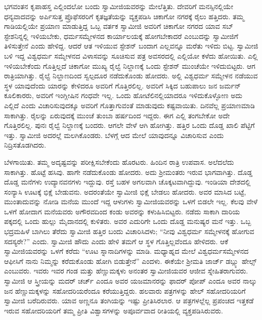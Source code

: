  ಭಗವಂತನ ಕೃಪಾಹಸ್ತ ಎಲ್ಲಿಂದಲೋ ಬಂದು ಸ್ವಾಮೀಜಿಯವರನ್ನು ಮೇಲೆತ್ತಿತು. ದೇವರಿಗೆ ಮನಸ್ಸಿನಲ್ಲಿಯೇ ಧನ್ಯವಾದವನ್ನು ಅರ್ಪಿಸುತ್ತ ಪ್ರೊಫೆಸರರಿಗೆ ಕೃತಜ್ಞತೆಯನ್ನು ವ್ಯಕ್ತಪಡಿಸಿ ಚಿಕಾಗೋ ನಗರಕ್ಕೆ ರೈಲು ಹತ್ತಿದರು. ತಮ್ಮ ಗಾಡಿಯಲ್ಲಿಯೇ ಪ್ರಯಾಣ ಮಾಡುತ್ತಿದ್ದ ಒಬ್ಬ ವರ್ತಕ ಸ್ವಾಮೀಜಿ ಅವರಿಗೆ ಚಿಕಾಗೋ ನಗರದ ಯಾವ ಸಬ್ ಸ್ಟೇಶನಿನ್ನಲ್ಲಿ ಇಳಿಯಬೇಕು, ಧರ್ಮಸಮ್ಮೇಳನದ ಕಾರ್ಯಾಲಯಕ್ಕೆ ಹೋಗಬೇಕಾದರೆ ಎಂಬುದನ್ನು ಸ್ವಾಮೀಜಿಗೆ ತಿಳಿಸುತ್ತೇನೆ ಎಂದು ಹೇಳಿದ್ದ. ಆದರೆ ಆತ ಇಳಿಯುವ ಸ್ಟೇಶನ್ ಬಂದಾಗ ಎಲ್ಲವನ್ನೂ ಮರೆತು ಇಳಿದು ಬಿಟ್ಟ. ಸ್ವಾಮೀಜಿ ಬಳಿ ಇದ್ದ ವಿಶ್ವಧರ್ಮ ಸಮ್ಮೇಳನದ ವಿಳಾಸವನ್ನು ಸೂಚಿಸುವ ಪತ್ರ ಅವಸರದಲ್ಲಿ ಎಲ್ಲಿಯೋ ಕಳೆದು ಹೋಯಿತು. ಎಲ್ಲಿ ಇಳಿಯಬೇಕೆಂದು ಗೊತ್ತಿಲ್ಲದೆ ಚಿಕಾಗೋ ಮುಖ್ಯ ರೈಲ್ವೆ ನಿಲ್ದಾಣಕ್ಕೆ ಒಂದು ಸ್ಟೇಶನ್ ಮುಂಚೆಯೇ ಇಳಿದುಬಿಟ್ಟರು. ಆಗ ರಾತ್ರಿಯಾಗಿತ್ತು. ರೈಲ್ವೆ ನಿಲ್ದಾಣದಿಂದ ಸ್ವಲ್ಪದೂರ ನಡೆದುಕೊಂಡು ಹೋದರು. ಅಲ್ಲಿ ವಿಶ್ವಧರ್ಮ ಸಮ್ಮೇಳನ ನಡೆಯುವ ಸ್ಥಳ ಯಾವುದೆಂದು ಯಾರನ್ನು ಕೇಳಿದರೂ ಅವರಿಗೆ ಗೊತ್ತಿರಲಿಲ್ಲ. ಅವರಿಗೆ ಸಿಕ್ಕಿದ ಬಹುಪಾಲು ಜನ ಜರ್ಮನ್ ಕೂಲಿಕಾರರು, ಅವರಿಗೆ ಇಂಗ್ಲೀಷಿನ ಗಂಧವೇ ಇಲ್ಲ. ಒಂದು ಹೋಟೆಲಿನಲ್ಲಿಯಾದರೂ ಇಳಿದುಕೊಳ್ಳೋಣ ಅದು ಎಲ್ಲಿದೆ ಎಂದು ವಿಚಾರಿಸುವುದಕ್ಕೂ ಅವರಿಗೆ ಗೊತ್ತಾಗುವಂತೆ ಮಾಡುವುದು ಕಷ್ಟವಾಯಿತು. ದಿನವೆಲ್ಲ ಪ್ರಯಾಣಮಾಡಿ ಸಾಕಾಗಿತ್ತು. ರೈಲನ್ನು ಏರುವುದಕ್ಕೆ ಮುಂಚೆ ತುಂಬಾ ಹರ್ಷದಿಂದ ಇದ್ದರು. ಈಗ ಎಲ್ಲಿ ತಂಗಬೇಕೋ ಅದೇ ಗೊತ್ತಿರಲಿಲ್ಲ. ಪುನಃ ರೈಲ್ವೆ ನಿಲ್ದಾಣಕ್ಕೆ ಬಂದರು. ಆಗಲೇ ವೇಳೆ ಆಗಿ ಹೋಗಿತ್ತು. ಹತ್ತಿರ ಒಂದು ದೊಡ್ಡ ಖಾಲಿ ಪೆಟ್ಟಿಗೆ ಇತ್ತು. ಸ್ವಾಮೀಜಿ ಅದರಲ್ಲೆ ಮಲಗಿಕೊಂಡರು. ಬೆಳಗ್ಗೆ ಆದ ಮೇಲೆ ಯಾವುದನ್ನೂ ವಿಚಾರಿಸುವ ಎಂದು ನಿದ್ರಿಸತೊಡಗಿದರು. 

 ಬೆಳಗಾಯಿತು. ತಮ್ಮ ಅದೃಷ್ಟವನ್ನು ಪರೀಕ್ಷಿಸಬೇಕೆಂದು ಹೊರಟರು. ಹಿಂದಿನ ರಾತ್ರಿ ಉಪವಾಸ. ಅಲೆದಲೆದು ಸಾಕಾಗಿತ್ತು. ಹೊಟ್ಟೆ ಹಸಿವು. ಹಾಗೇ ನಡೆದುಕೊಂಡು ಹೋದರು. ಅದು ಶ‍್ರೀಮಂತರು ಇರುವ ಭಾಗವಾಗಿತ್ತು. ದೊಡ್ಡ ದೊಡ್ಡ ಮನೆಗಳು ಉದ್ಯಾನವನಗಳು ಇದ್ದುವು. ರಸ್ತೆ ಬಹಳ ಅಗಲವಾಗಿ ಚೊಕ್ಕಟವಾಗಿದ್ದುವು. ಇಂಡಿಯಾ ದೇಶದಲ್ಲಿ ಸಂನ್ಯಾಸಿ ಊಟಕ್ಕೆ ಭಿಕ್ಷೆ ಬೇಡುವನು. ಅದರಂತೆಯೇ ಸ್ವಾಮೀಜಿ ಭಿಕ್ಷೆ ಬೇಡಲು ಹೋದರು. ಅವರ ಮಾಸಿದ ಬಟ್ಟೆ, ಮುಂತಾದುವನ್ನು ನೋಡಿ ಮನೆಯ ಮುಂದೆ ಇದ್ದ ಆಳುಗಳು ಸ್ವಾಮೀಜಿಯವರನ್ನು ಒಳಗೆ ಬಿಡಲೇ ಇಲ್ಲ. ಕೆಲವು ವೇಳೆ ಒಳಗೆ ಹೋದಾಗ ಮನೆಯವರು ಅಗೌರವದಿಂದ ಕಂಡು ಅವರನ್ನು ಕಳುಹಿಸಿಬಿಟ್ಟರು. ನಡೆದು ಸಾಕಾಗಿ ದಾರಿಯ ಪಕ್ಕದಲ್ಲಿ ಒಂದು ಹುಲ್ಲು ಮೈದಾನದಲ್ಲಿ ಕುಳಿತರು. ಅವರ ಎದುರಿಗೇ ಒಂದು ದೊಡ್ಡ ಮನುಷ್ಯರ ಮನೆ ಇತ್ತು. ಒಬ್ಬ ಭದ್ರಮಹಿಳೆ ಬಾಗಿಲು ತೆರೆದು ಸ್ವಾಮೀಜಿ ಹತ್ತಿರ ಬಂದು ವಿಚಾರಿಸಿದಳು; “ನೀವು ವಿಶ್ವಧರ್ಮ ಸಮ್ಮೇಳನಕ್ಕೆ ಹೋಗುವ ಸದಸ್ಯರೇ?” ಎಂದು. ಸ್ವಾಮೀಜಿ ಹೌದು ಎಂದು ಹೇಳಿ ತಮಗೆ ಆ ಸ್ಥಳ ಗೊತ್ತಿಲ್ಲವೆಂದೂ ಹೇಳಿದರು. ಆಕೆ ಸ್ವಾಮೀಜಿಯವರನ್ನು ಒಳಗೆ ಕರೆದು “ಊಟ ಸ್ನಾನಾದಿಗಳನ್ನು ಮಾಡಿ. ಮಧ್ಯಾಹ್ನದ ಮೇಲೆ ವಿಶ್ವಧರ್ಮಸಮ್ಮೇಳನದ ಆಫೀಸಿಗೆ ನಾನು ನಿಮ್ಮನ್ನು ಕರೆದುಕೊಂಡು ಹೋಗಿ ಬಿಡುತ್ತೇನೆ” ಎಂದಳು. ಈಕೆಯೇ ಶ‍್ರೀಮತಿ ಜಾರ್ಜ್ ಡಬ್ಲ್ಯು ಹೇಲ್ಸ್ ಎಂಬುವರು. ಇವರು ಇವರ ಗಂಡ ಮತ್ತು ಹೆಣ್ಣುಮಕ್ಕಳು ಅನಂತರ ಸ್ವಾಮೀಜಿಯವರ ಆಜೀವ ಸ್ನೇಹಿತರಾಗುವರು. ಸ್ವಾಮೀಜಿ ಆ ಸ್ತ್ರೀಯನ್ನು ಮದರ್ ಚರ್ಚ್ ಎಂದೂ ಅವರ ಯಜಮಾನರನ್ನು ಫಾದರ್ ಪೋಪ್ ಎಂದೂ ಅವರ ನಾಲ್ಕು ಜನ ಹೆಣ್ಣುಮಕ್ಕಳನ್ನು ಸಹೋದರಿಯರೆಂದೂ ಕರೆಯುತ್ತಿದ್ದರು. ಹಲವಾರು ಪತ್ರಗಳನ್ನು ಹೇಲ್ ಸಹೋದರಿಯರಿಗೆ ಸ್ವಾಮೀಜಿ ಬರೆದಿರುವರು. ಯಾವ ಅಣ್ಣನೂ ತಂಗಿಯನ್ನು ಇಷ್ಟು ಪ್ರೀತಿಸಿರಲಾರ. ಆ ಪತ್ರಗಳಲ್ಲೆಲ್ಲ ಪ್ರಪಂಚದ ಇತ್ತಕಡೆ ಇರುವ ಸಹೋದರಿಯರಿಗೆ ತಮ್ಮ ಪ್ರೀತಿ ವಿಶ್ವಾಸಗಳನ್ನು ಅಪೂರ್ವವಾದ ರೀತಿಯಲ್ಲಿ ವ್ಯಕ್ತಪಡಿಸಿರುವರು. 

